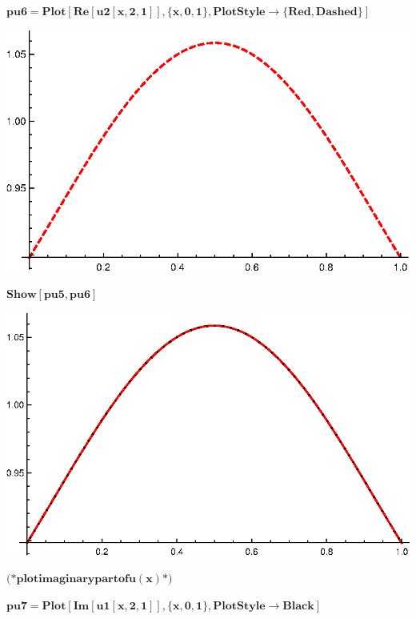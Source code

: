 {\begin{doublespace}
\noindent\(\pmb{\text{pu6}=\text{Plot}[\text{Re}[\text{u2}[x,2,1]],\{x,0,1\},\text{PlotStyle}\to \{\text{Red},\text{Dashed}\}]}\)
\end{doublespace}

\includegraphics{chapters/appendices/KP_Mathematica/Kronig_Penney_model_transfer_matrix_gr15.eps}

\begin{doublespace}
\noindent\(\pmb{\text{Show}[\text{pu5},\text{pu6}]}\)
\end{doublespace}

\includegraphics{chapters/appendices/KP_Mathematica/Kronig_Penney_model_transfer_matrix_gr16.eps}

\begin{doublespace}
\noindent\(\pmb{\text{(*} \text{plot} \text{imaginary} \text{part} \text{of} u(x) \text{*)}}\)
\end{doublespace}

\begin{doublespace}
\noindent\(\pmb{\text{pu7}=\text{Plot}[\text{Im}[\text{u1}[x,2,1]],\{x,0,1\},\text{PlotStyle}\to \text{Black}]}\)
\end{doublespace}

}
